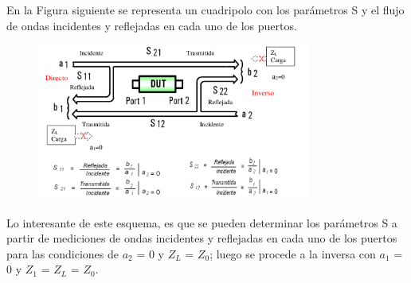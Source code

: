 \documentclass[a4paper,12pt,twoside]{article}
\begin{document}
En la Figura siguiente se representa un cuadripolo con los parámetros S y el flujo de ondas
incidentes y reflejadas en cada uno de los puertos.

\begin{figure}[H]
    \centering
    \includegraphics[width=0.8\textwidth]{../img/parametros_s2.png}
\end{figure}

Lo interesante de este esquema, es que se pueden determinar los parámetros S a partir de
mediciones de ondas incidentes y reflejadas en cada uno de los puertos para las condiciones
de $a_2$ = $0$ y $Z_L$ = $Z_0$; luego se procede a la inversa con $a_1$ = $0$ y $Z_1$ = $Z_L$ = $Z_0$.
\end{document}
